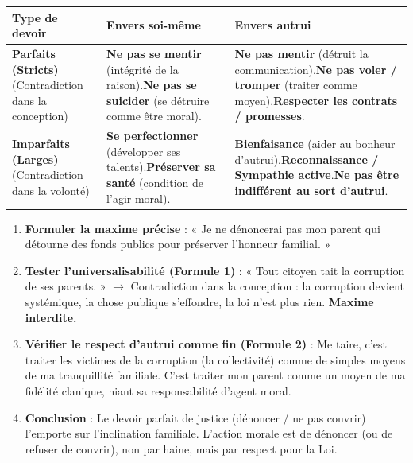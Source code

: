 \documentclass[11pt]{article}
\begin{document}
\begin{center}
\begin{tabularx}{\linewidth}{|l|X|X|}
\hline
\rowcolor{popblueL}
\textbf{Type de devoir} & \textbf{Envers soi-même} & \textbf{Envers autrui} \\
\hline
\textbf{Parfaits (Stricts)}\newline(Contradiction dans la conception) & \textbf{Ne pas se mentir} (intégrité de la raison).\newline\textbf{Ne pas se suicider} (se détruire comme être moral). & \textbf{Ne pas mentir} (détruit la communication).\newline\textbf{Ne pas voler / tromper} (traiter comme moyen).\newline\textbf{Respecter les contrats / promesses}. \\
\hline
\textbf{Imparfaits (Larges)}\newline(Contradiction dans la volonté) & \textbf{Se perfectionner} (développer ses talents).\newline\textbf{Préserver sa santé} (condition de l'agir moral). & \textbf{Bienfaisance} (aider au bonheur d'autrui).\newline\textbf{Reconnaissance / Sympathie active}.\newline\textbf{Ne pas être indifférent au sort d'autrui}. \\
\hline
\end{tabularx}
\end{center}

\begin{methode}
\begin{enumerate}
    \item \textbf{Formuler la maxime précise} : « Je ne dénoncerai pas mon parent qui détourne des fonds publics pour préserver l'honneur familial. »
    \item \textbf{Tester l'universalisabilité (Formule 1)} : « Tout citoyen tait la corruption de ses parents. » $\rightarrow$ Contradiction dans la conception : la corruption devient systémique, la chose publique s'effondre, la loi n'est plus rien. \textbf{Maxime interdite.}
    \item \textbf{Vérifier le respect d'autrui comme fin (Formule 2)} : Me taire, c'est traiter les victimes de la corruption (la collectivité) comme de simples moyens de ma tranquillité familiale. C'est traiter mon parent comme un moyen de ma fidélité clanique, niant sa responsabilité d'agent moral.
    \item \textbf{Conclusion} : Le devoir parfait de justice (dénoncer / ne pas couvrir) l'emporte sur l'inclination familiale. L'action morale est de dénoncer (ou de refuser de couvrir), non par haine, mais par respect pour la Loi.
\end{enumerate}
\end{methode}
\end{document}
